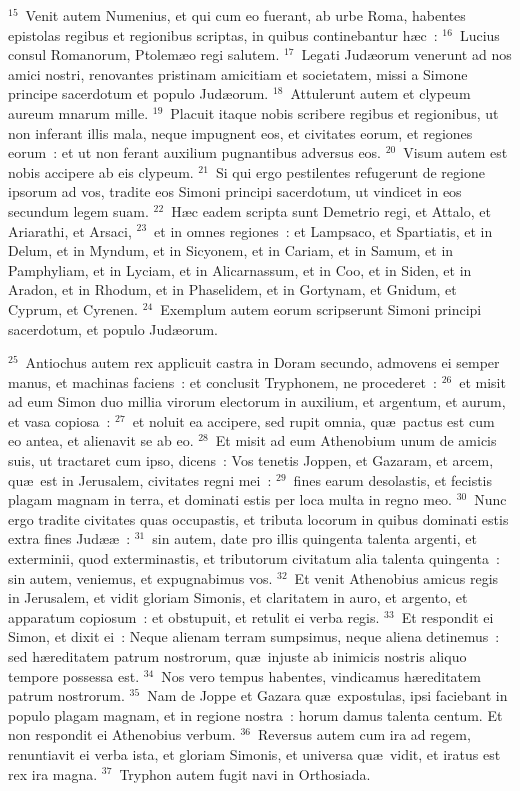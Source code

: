 ${}^{15}$~Venit autem Numenius, et qui cum eo fuerant, ab urbe Roma, habentes epistolas regibus et regionibus scriptas, in quibus continebantur h\ae c~:
${}^{16}$~Lucius consul Romanorum, Ptolem\ae o regi salutem.
${}^{17}$~Legati Jud\ae orum venerunt ad nos amici nostri, renovantes pristinam amicitiam et societatem, missi a Simone principe sacerdotum et populo Jud\ae orum.
${}^{18}$~Attulerunt autem et clypeum aureum mnarum mille.
${}^{19}$~Placuit itaque nobis scribere regibus et regionibus, ut non inferant illis mala, neque impugnent eos, et civitates eorum, et regiones eorum~: et ut non ferant auxilium pugnantibus adversus eos.
${}^{20}$~Visum autem est nobis accipere ab eis clypeum.
${}^{21}$~Si qui ergo pestilentes refugerunt de regione ipsorum ad vos, tradite eos Simoni principi sacerdotum, ut vindicet in eos secundum legem suam.
${}^{22}$~H\ae c eadem scripta sunt Demetrio regi, et Attalo, et Ariarathi, et Arsaci,
${}^{23}$~et in omnes regiones~: et Lampsaco, et Spartiatis, et in Delum, et in Myndum, et in Sicyonem, et in Cariam, et in Samum, et in Pamphyliam, et in Lyciam, et in Alicarnassum, et in Coo, et in Siden, et in Aradon, et in Rhodum, et in Phaselidem, et in Gortynam, et Gnidum, et Cyprum, et Cyrenen.
${}^{24}$~Exemplum autem eorum scripserunt Simoni principi sacerdotum, et populo Jud\ae orum.


${}^{25}$~Antiochus autem rex applicuit castra in Doram secundo, admovens ei semper manus, et machinas faciens~: et conclusit Tryphonem, ne procederet~:
${}^{26}$~et misit ad eum Simon duo millia virorum electorum in auxilium, et argentum, et aurum, et vasa copiosa~:
${}^{27}$~et noluit ea accipere, sed rupit omnia, qu\ae\ pactus est cum eo antea, et alienavit se ab eo.
${}^{28}$~Et misit ad eum Athenobium unum de amicis suis, ut tractaret cum ipso, dicens~: Vos tenetis Joppen, et Gazaram, et arcem, qu\ae\ est in Jerusalem, civitates regni mei~:
${}^{29}$~fines earum desolastis, et fecistis plagam magnam in terra, et dominati estis per loca multa in regno meo.
${}^{30}$~Nunc ergo tradite civitates quas occupastis, et tributa locorum in quibus dominati estis extra fines Jud\ae \ae~:
${}^{31}$~sin autem, date pro illis quingenta talenta argenti, et exterminii, quod exterminastis, et tributorum civitatum alia talenta quingenta~: sin autem, veniemus, et expugnabimus vos.
${}^{32}$~Et venit Athenobius amicus regis in Jerusalem, et vidit gloriam Simonis, et claritatem in auro, et argento, et apparatum copiosum~: et obstupuit, et retulit ei verba regis.
${}^{33}$~Et respondit ei Simon, et dixit ei~: Neque alienam terram sumpsimus, neque aliena detinemus~: sed h\ae reditatem patrum nostrorum, qu\ae\ injuste ab inimicis nostris aliquo tempore possessa est.
${}^{34}$~Nos vero tempus habentes, vindicamus h\ae reditatem patrum nostrorum.
${}^{35}$~Nam de Joppe et Gazara qu\ae\ expostulas, ipsi faciebant in populo plagam magnam, et in regione nostra~: horum damus talenta centum. Et non respondit ei Athenobius verbum.
${}^{36}$~Reversus autem cum ira ad regem, renuntiavit ei verba ista, et gloriam Simonis, et universa qu\ae\ vidit, et iratus est rex ira magna.
${}^{37}$~Tryphon autem fugit navi in Orthosiada.


